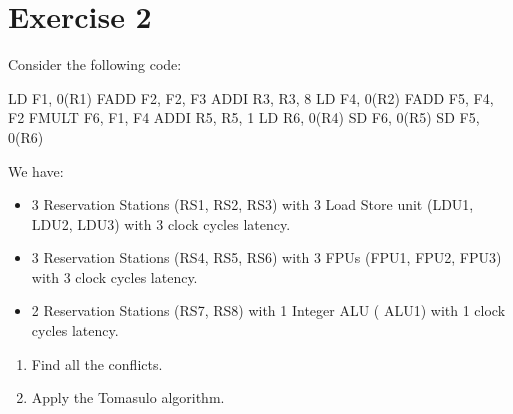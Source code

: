 \section{Exercise 2}

Consider the following code: 
\begin{verbnobox}[\verbarg]
LD F1, 0(R1)
FADD F2, F2, F3
ADDI R3, R3, 8
LD F4, 0(R2)
FADD F5, F4, F2
FMULT F6, F1, F4
ADDI R5, R5, 1
LD R6, 0(R4)
SD F6, 0(R5)
SD F5, 0(R6)
\end{verbnobox}
We have: 
\begin{itemize}
    \item 3 Reservation Stations (RS1, RS2, RS3) with 3 Load Store unit (LDU1, LDU2, LDU3) with 3 clock cycles latency.
    \item 3 Reservation Stations (RS4, RS5, RS6) with 3 FPUs (FPU1, FPU2, FPU3) with 3 clock cycles latency.
    \item 2 Reservation Stations (RS7, RS8) with 1 Integer ALU ( ALU1) with 1 clock cycles latency. 
\end{itemize}
\begin{enumerate}
    \item Find all the conflicts. 
    \item Apply the Tomasulo algorithm. 
\end{enumerate}

